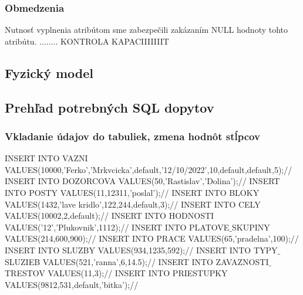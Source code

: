 \documentclass[slovak, 12pt, Times New Roman]{article}
\begin{document}
			\subsubsection{Obmedzenia}
				Nutnosť vyplnenia atribútom sme zabezpečili zakázaním NULL hodnoty tohto atribútu. 
				........ KONTROLA KAPACIIIIIIIT
		\subsection{Fyzický model}
		\subsection{Prehľad potrebných SQL dopytov}
			\subsubsection{Vkladanie údajov do tabuliek, zmena hodnôt stĺpcov}
				INSERT INTO VAZNI VALUES(10000,'Ferko','Mrkvcicka',default,'12/10/2022',10,default,default,5);//
				INSERT INTO DOZORCOVA VALUES(50,'Rastislav','Dolina');//
				INSERT INTO POSTY VALUES(11,12311,'poslal');//
				INSERT INTO BLOKY VALUES(1432,'lave kridlo',122,244,default,3);//
				INSERT INTO CELY VALUES(10002,2,default);//
				INSERT INTO HODNOSTI VALUES('12','Plukovnik',1112);//
				INSERT INTO PLATOVE$\_$SKUPINY VALUES(214,600,900);//
				INSERT INTO PRACE VALUES(65,'pradelna',100);//
				INSERT INTO SLUZBY VALUES(934,1235,592);//
				INSERT INTO TYPY$\_$SLUZIEB VALUES(521,'ranna',6,14.5);//
				INSERT INTO ZAVAZNOSTI$\_$TRESTOV VALUES(11,3);//
				INSERT INTO PRIESTUPKY VALUES(9812,531,default,'bitka');//
			\clearpage
\end{document}

